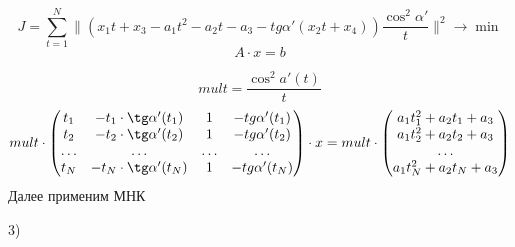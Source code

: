 \documentclass[a4paper,14pt]{article}
\theoremstyle{plain} %
\theoremstyle{definition} %
\theoremstyle{remark} %
\begin{document}
\[ J=\sum_{t=1}^{N} \lVert( x_1t+x_3-a_1t^2-a_2t-a_3-tg\alpha'( x_2t+x_4))\frac{\cos^2\alpha'}{t} \rVert^2 \rightarrow \min \]
\[
A\cdot x=b
\]

\[
mult=\frac{\cos^2a'(t)}{t}
\]
\[
    mult\cdot
\begin{pmatrix}
    t_1 & -t_1\cdot \tg \alpha'(t_1)  & 1 & -tg \alpha'(t_1) \\
    t_2 & -t_2\cdot \tg \alpha'(t_2)  & 1 & -tg \alpha'(t_2) \\
    \dots & \dots & \dots & \dots \\
    t_N & -t_N\cdot \tg \alpha'(t_N)  & 1 & -tg \alpha'(t_N)
\end{pmatrix}
\cdot x =    mult\cdot
\begin{pmatrix}
    a_1t_1^2+a_2t_1+a_3 \\
    a_1t_2^2+a_2t_2+a_3 \\
    \dots  \\
    a_1t_N^2+a_2t_N+a_3 \\
\end{pmatrix}
\]
Далее применим МНК

3)
\end{document}
